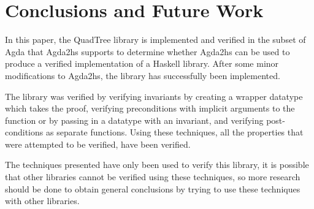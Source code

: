\section{Conclusions and Future Work}
In this paper, the QuadTree library is implemented and verified in the subset of Agda that Agda2hs supports to determine whether Agda2hs can be used to produce a verified implementation of a Haskell library. After some minor modifications to Agda2hs, the library has successfully been implemented. 

The library was verified by verifying invariants by creating a wrapper datatype which takes the proof, verifying preconditions with implicit arguments to the function or by passing in a datatype with an invariant, and verifying post-conditions as separate functions.  Using these techniques, all the properties that were attempted to be verified, have been verified.

The techniques presented have only been used to verify this library, it is possible that other libraries cannot be verified using these techniques, so more research should be done to obtain general conclusions by trying to use these techniques with other libraries. 